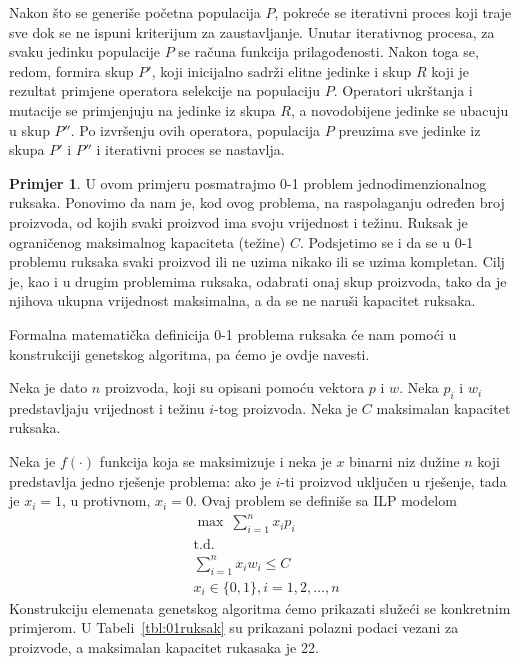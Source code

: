 \documentclass[b5paper, utf8, 11pt, colorlinks]{book}
\theoremstyle{definition}
\newtheorem{primjer}{Primjer}[chapter]
\begin{document}
 Nakon što se generiše početna populacija $P$, pokreće se iterativni proces koji traje sve dok se ne ispuni kriterijum za zaustavljanje. Unutar iterativnog procesa, za svaku jedinku populacije $P$ se računa funkcija prilagođenosti. Nakon toga se, redom, formira skup $P'$, koji inicijalno sadrži elitne jedinke i skup $R$ koji je rezultat primjene operatora selekcije na populaciju $P$. Operatori ukrštanja i mutacije se primjenjuju na jedinke iz skupa $R$, a novodobijene jedinke se ubacuju u skup $P''$. Po izvršenju ovih operatora, populacija $P$ preuzima sve jedinke iz skupa $P'$ i $P''$ i iterativni proces se nastavlja.

\begin{primjer}\label{primjer:01ruksak} U ovom primjeru posmatrajmo 0-1 problem jednodimenzionalnog ruksaka. Ponovimo da nam je, kod ovog problema, na raspolaganju određen broj proizvoda, od kojih svaki proizvod ima svoju vrijednost i težinu. Ruksak je ograničenog maksimalnog kapaciteta (težine) $C$. Podsjetimo se i da se u 0-1 problemu ruksaka svaki proizvod ili ne uzima nikako ili se uzima kompletan. Cilj je, kao i u drugim problemima ruksaka, odabrati onaj skup proizvoda, tako da je njihova ukupna vrijednost maksimalna, a da se ne naruši kapacitet ruksaka.
\end{primjer}
Formalna matematička definicija 0-1 problema ruksaka će nam pomoći u konstrukciji genetskog algoritma, pa ćemo je ovdje navesti.

Neka je dato $n$ proizvoda, koji su opisani pomoću vektora $p$ i $w$. Neka $p_i$ i $w_i$ predstavljaju vrijednost i težinu $i$-tog proizvoda. Neka je $C$ maksimalan kapacitet ruksaka.

Neka je $f(\cdot)$ funkcija koja se maksimizuje i neka je $x$ binarni niz dužine $n$ koji predstavlja jedno rješenje problema: ako je $i$-ti proizvod uključen u rješenje, tada je $x_i = 1$, u protivnom, $x_i =0$. Ovaj problem se definiše sa ILP modelom
\begin{align*}
& \max\ \sum_{i=1}^{n}x_ip_i\\
&\mbox{t.d.}\\
&\sum_{i=1}^{n}x_iw_i\leqslant C\\
&x_i\in\{0,1\}, i = 1,2,\ldots,n
\end{align*}
Konstrukciju elemenata genetskog algoritma ćemo prikazati služeći se konkretnim primjerom. U Tabeli~\ref{tbl:01ruksak} su prikazani polazni podaci vezani za proizvode, a maksimalan kapacitet rukasaka je 22.
\end{document}
